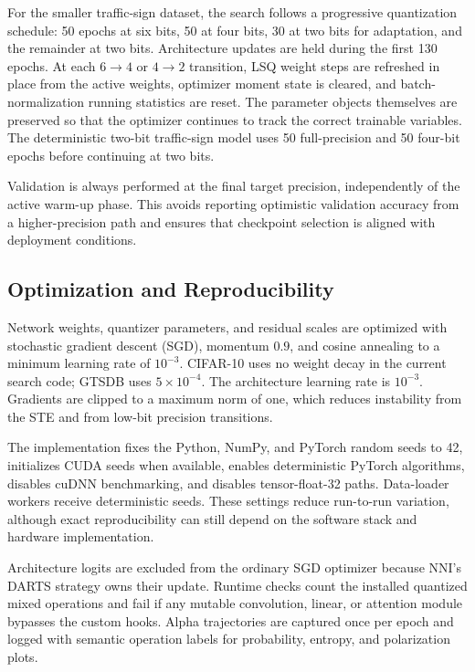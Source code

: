 \documentclass[lettersize,journal]{IEEEtran}
\begin{document}
For the smaller traffic-sign dataset, the search follows a progressive quantization schedule: 50 epochs at six bits, 50 at four bits, 30 at two bits for adaptation, and the remainder at two bits. Architecture updates are held during the first 130 epochs. At each $6\rightarrow4$ or $4\rightarrow2$ transition, LSQ weight steps are refreshed in place from the active weights, optimizer moment state is cleared, and batch-normalization running statistics are reset. The parameter objects themselves are preserved so that the optimizer continues to track the correct trainable variables. The deterministic two-bit traffic-sign model uses 50 full-precision and 50 four-bit epochs before continuing at two bits.

Validation is always performed at the final target precision, independently of the active warm-up phase. This avoids reporting optimistic validation accuracy from a higher-precision path and ensures that checkpoint selection is aligned with deployment conditions.

\subsection{Optimization and Reproducibility}
Network weights, quantizer parameters, and residual scales are optimized with stochastic gradient descent (SGD), momentum $0.9$, and cosine annealing to a minimum learning rate of $10^{-3}$. CIFAR-10 uses no weight decay in the current search code; GTSDB uses $5\times10^{-4}$. The architecture learning rate is $10^{-3}$. Gradients are clipped to a maximum norm of one, which reduces instability from the STE and from low-bit precision transitions.

The implementation fixes the Python, NumPy, and PyTorch random seeds to 42, initializes CUDA seeds when available, enables deterministic PyTorch algorithms, disables cuDNN benchmarking, and disables tensor-float-32 paths. Data-loader workers receive deterministic seeds. These settings reduce run-to-run variation, although exact reproducibility can still depend on the software stack and hardware implementation.

Architecture logits are excluded from the ordinary SGD optimizer because NNI's DARTS strategy owns their update. Runtime checks count the installed quantized mixed operations and fail if any mutable convolution, linear, or attention module bypasses the custom hooks. Alpha trajectories are captured once per epoch and logged with semantic operation labels for probability, entropy, and polarization plots.
\end{document}
